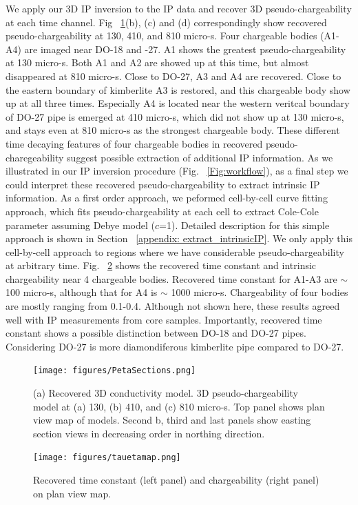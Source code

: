 \documentclass[letterpaper,11pt]{article}
\begin{document}
We apply our 3D IP inversion to the IP data and recover 3D pseudo-chargeability at each time channel. Fig ~\ref{Fig:PetaSections}(b), (c) and (d) correspondingly show recovered pseudo-chargeability at 130, 410, and 810 micro-s. 
Four chargeable bodies (A1-A4) are imaged near DO-18 and -27. A1 shows the greatest pseudo-chargeability at 130 micro-s. Both A1 and A2 are showed up at this time, but almost disappeared at 810 micro-s. Close to DO-27, A3 and A4 are recovered. Close to the eastern boundary of kimberlite A3 is restored, and this chargeable body show up at all three times. Especially A4 is located near the western veritcal boundary of DO-27 pipe is emerged at 410 micro-s, which did not show up at 130 micro-s, and stays even at 810 micro-s as the strongest chargeable body. These different time decaying features of four chargeable bodies in recovered pseudo-charegeability suggest possible extraction of additional IP information. As we illustrated in our IP inversion procedure (Fig. ~\ref{Fig:workflow}), as a final step we could interpret these recovered pseudo-chargeability to extract intrinsic IP information. As a first order approach, we peformed cell-by-cell curve fitting approach, which fits pseudo-chargeability at each cell to extract Cole-Cole parameter assuming Debye model ($c$=1). Detailed description for this simple approach is shown in Section ~\ref{appendix: extract_intrinsicIP}. We only apply this cell-by-cell approach to regions where we have considerable pseudo-chargeability at arbitrary time. Fig. ~\ref{Fig:tauetamap} shows the recovered time constant and intrinsic chargeability near 4 chargeable bodies. Recovered time constant for A1-A3 are $\sim$ 100 micro-s, although that for A4 is $\sim$ 1000 micro-s. Chargeability of four bodies are mostly ranging from 0.1-0.4. Although not shown here, these results agreed well with IP measurements from core samples. Importantly, recovered time constant shows a possible distinction between DO-18 and DO-27 pipes. Considering DO-27 is more diamondiferous kimberlite pipe compared to DO-27. 

\begin{figure}[htb]
  \centering
  \texttt{[image: figures/PetaSections.png]}
  \caption{(a) Recovered 3D conductivity model. 3D pseudo-chargeability model at (a) 130, (b) 410, and (c) 810 micro-s. Top panel shows plan view map of models. Second b, third and last panels show easting section views in decreasing order in northing direction. }
  \label{Fig:PetaSections}
\end{figure}
\begin{figure}[htb]
  \centering
  \texttt{[image: figures/tauetamap.png]}
  \caption{Recovered time constant (left panel) and chargeability (right panel) on plan view map. }
  \label{Fig:tauetamap}
\end{figure}
\clearpage
\end{document}
